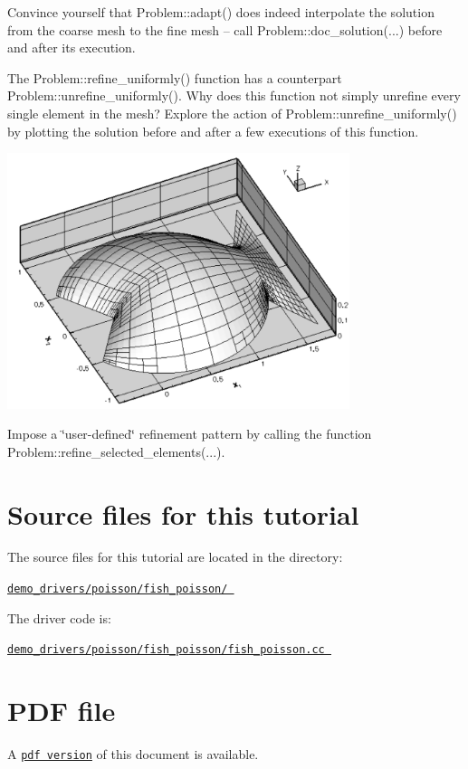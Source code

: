 \begin{DoxyEnumerate}
\item Convince yourself that {\ttfamily Problem\+::adapt()} does indeed interpolate the solution from the coarse mesh to the fine mesh -- call {\ttfamily Problem\+::doc\+\_\+solution}(...) before and after its execution.
\item The {\ttfamily Problem\+::refine\+\_\+uniformly()} function has a counterpart {\ttfamily Problem\+::unrefine\+\_\+uniformly()}. Why does this function not simply unrefine every single element in the mesh? Explore the action of {\ttfamily Problem\+::unrefine\+\_\+uniformly()} by plotting the solution before and after a few executions of this function.  
\begin{DoxyImage}
\includegraphics[width=0.75\textwidth]{fish_poisson_soln3}
\end{DoxyImage}

\item Impose a \char`\"{}user-\/defined\char`\"{} refinement pattern by calling the function {\ttfamily Problem\+::refine\+\_\+selected\+\_\+elements}(...).
\end{DoxyEnumerate}



 

\hypertarget{index_sources}{}\section{Source files for this tutorial}\label{index_sources}

\begin{DoxyItemize}
\item The source files for this tutorial are located in the directory\+: \begin{center} \href{../../../../demo_drivers/poisson/fish_poisson/}{\tt demo\+\_\+drivers/poisson/fish\+\_\+poisson/ } \end{center} 
\item The driver code is\+: \begin{center} \href{../../../../demo_drivers/poisson/fish_poisson/fish_poisson.cc}{\tt demo\+\_\+drivers/poisson/fish\+\_\+poisson/fish\+\_\+poisson.\+cc } \end{center} 
\end{DoxyItemize}

 

 \hypertarget{index_pdf}{}\section{P\+D\+F file}\label{index_pdf}
A \href{../latex/refman.pdf}{\tt pdf version} of this document is available. 
